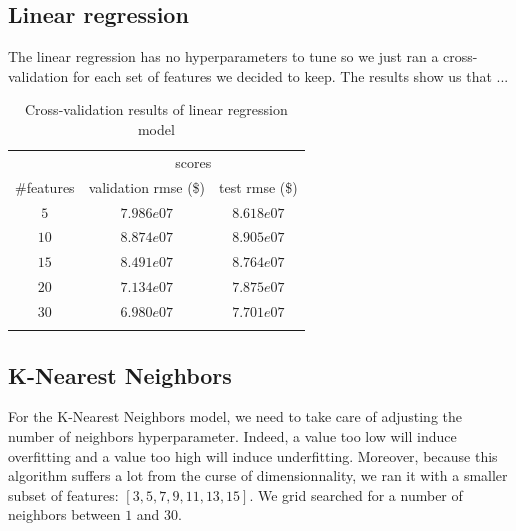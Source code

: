 
\subsection{Linear regression}

The linear regression has no hyperparameters to tune so we just ran a cross-validation for each set of features we decided to keep. The results show us that ... 

\begin{table}[H]
	\centering
	\begin{tabular}{ccc} \toprule
	  & \multicolumn {2}{c}{scores} \\\cmidrule(lr) {2-3}
	  \#features         & validation rmse (\$)             & test rmse (\$) \\\hline
	  $5$        		& $7.986e07$                      	& $8.618e07$ \\
	  $10$        		& $8.874e07$                        & $8.905e07$ \\
	  $15$        		& $8.491e07$                        & $8.764e07$ \\
	  $20$             	& $7.134e07$                        & $7.875e07$ \\
	  $30$             	& $6.980e07$                        & $7.701e07$ \\
	  \\\hline
	\end{tabular}
	\caption{Cross-validation results of linear regression model}
	\label{tab:linear-regression-results}
\end{table}

\subsection{K-Nearest Neighbors}

For the K-Nearest Neighbors model, we need to take care of adjusting the number of neighbors hyperparameter. Indeed, a value too low will induce overfitting and a value too high will induce underfitting. Moreover, because this algorithm suffers a lot from the curse of dimensionnality, we ran it with a smaller subset of features: $[3,5,7,9,11,13,15]$. We grid searched for a number of neighbors between $1$ and $30$.

